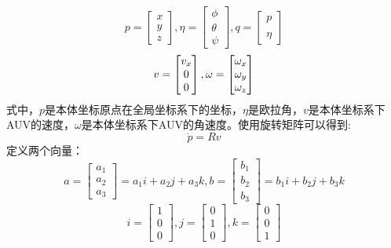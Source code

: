 \begin{equation}
    p=\begin{bmatrix}{x}\\{y}\\{z}\end{bmatrix},
    \eta=\begin{bmatrix}\phi\\\theta\\\psi\end{bmatrix},
    {q}=\begin{bmatrix}p\\\\\eta\end{bmatrix}
\end{equation}
\begin{equation}
    \\v=
    \begin{bmatrix}v_{x}\\0\\0\end{bmatrix}, 
    \omega=\begin{bmatrix}\omega_{x}\\\omega_{y}\\
        \omega_{z}
    \end{bmatrix} 
\end{equation}
式中，$p$是本体坐标原点在全局坐标系下的坐标，$\eta$是欧拉角，$v$是本体坐标系下AUV的速度，$\omega$是本体坐标系下AUV的角速度。使用旋转矩阵可以得到\cite{ref22}:
\begin{equation}
    \dot{p} = Rv 
\end{equation}
定义两个向量：
\begin{equation}
    a=\begin{bmatrix}a_1\\a_2\\a_3\end{bmatrix}=a_1i+a_2j+a_3k,b=\begin{bmatrix}b_1\\b_2\\b_3\end{bmatrix}=b_1i+b_2j+b_3k
\end{equation}
\begin{equation}
    i=\begin{bmatrix}1\\0\\0\end{bmatrix},j=\begin{bmatrix}0\\1\\0\end{bmatrix},k=\begin{bmatrix}0\\0\\1\end{bmatrix}
\end{equation}
